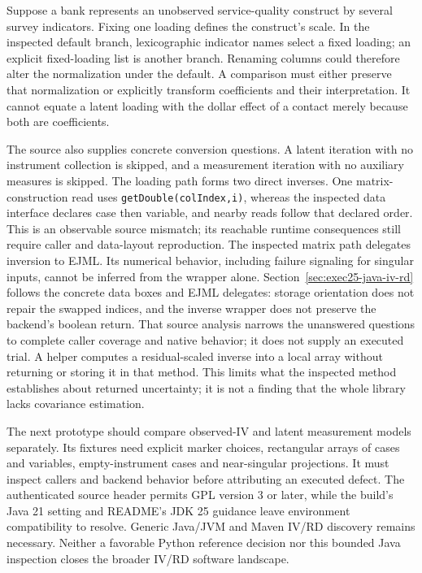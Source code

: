 Suppose a bank represents an unobserved service-quality construct by several
survey indicators. Fixing one loading defines the construct's scale. In the
inspected default branch, lexicographic indicator names select a fixed loading;
an explicit fixed-loading list is another branch. Renaming columns could
therefore alter the normalization under the default. A comparison must either
preserve that normalization or explicitly transform coefficients and their
interpretation. It cannot equate a latent loading with the dollar effect of a
contact merely because both are coefficients.

The source also supplies concrete conversion questions. A latent iteration
with no instrument collection is skipped, and a measurement iteration with
no auxiliary measures is skipped. The loading path forms two direct inverses.
One matrix-construction read uses \texttt{getDouble(colIndex,i)}, whereas the
inspected data interface declares case then variable, and nearby reads follow
that declared order. This is an observable source mismatch; its reachable
runtime consequences still require caller and data-layout reproduction.
The inspected matrix path delegates inversion to EJML. Its numerical behavior,
including failure signaling for singular inputs, cannot be inferred from the
wrapper alone. Section~\ref{sec:exec25-java-iv-rd} follows the concrete data
boxes and EJML delegates: storage orientation does not repair the swapped
indices, and the inverse wrapper does not preserve the backend's boolean
return. That source analysis narrows the unanswered questions to complete
caller coverage and native behavior; it does not supply an executed trial. A helper computes a residual-scaled inverse into a local array
without returning or storing it in that method. This limits what the inspected
method establishes about returned uncertainty; it is not a finding that the
whole library lacks covariance estimation.~\citep{exec22_java_latent_iv_preflight}

The next prototype should compare observed-IV and latent measurement models
separately. Its fixtures need explicit marker choices, rectangular arrays of
cases and variables, empty-instrument cases and near-singular projections. It must inspect
callers and backend behavior before attributing an executed defect. The
authenticated source header permits GPL version 3 or later, while the build's
Java 21 setting and README's JDK 25 guidance leave environment compatibility
to resolve. Generic Java/JVM and Maven IV/RD discovery remains necessary.
Neither a favorable Python reference decision nor this bounded Java inspection
closes the broader IV/RD software landscape.


